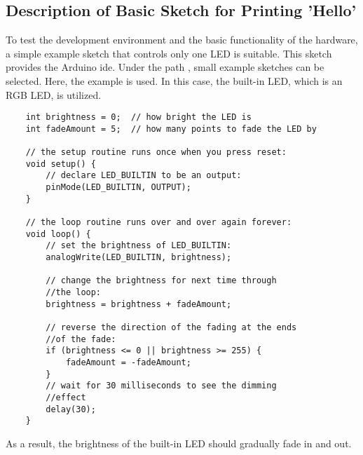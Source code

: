 %
\subsection{Description of Basic Sketch for Printing 'Hello'}

To test the development environment and the basic functionality of the hardware, a simple example sketch that controls only one LED is suitable. This sketch provides the Arduino \ac{ide}. Under the path , small example sketches can be selected. Here, the example  is used. In this case, the built-in LED, which is an RGB LED, is utilized. 


\begin{lstlisting}
	int brightness = 0;  // how bright the LED is
	int fadeAmount = 5;  // how many points to fade the LED by
	
	// the setup routine runs once when you press reset:
	void setup() {
		// declare LED_BUILTIN to be an output:
		pinMode(LED_BUILTIN, OUTPUT);
	}
	
	// the loop routine runs over and over again forever:
	void loop() {
		// set the brightness of LED_BUILTIN:
		analogWrite(LED_BUILTIN, brightness);
		
		// change the brightness for next time through 
		//the loop:
		brightness = brightness + fadeAmount;
		
		// reverse the direction of the fading at the ends 
		//of the fade:
		if (brightness <= 0 || brightness >= 255) {
			fadeAmount = -fadeAmount;
		}
		// wait for 30 milliseconds to see the dimming 
		//effect
		delay(30);
	}
\end{lstlisting}


As a result, the brightness of the built-in LED should gradually fade in and out.

%

